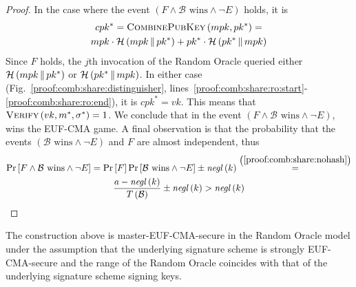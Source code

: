 \begin{proof}
      In the case where the event $\left(F \wedge \mathcal{B} \text{ wins}
      \wedge \neg E\right)$ holds, it is
      \begin{gather*}
        cpk^* = \textsc{CombinePubKey}\left(mpk, pk^*\right) = \\
        mpk \cdot \mathcal{H}\left(mpk \,\|\, pk^*\right) + pk^* \cdot
        \mathcal{H}\left(pk^* \,\|\, mpk\right)
      \end{gather*}
      Since $F$ holds, the $j$th invocation of the Random Oracle queried either
      $\mathcal{H}\left(mpk \,\|\, pk^*\right)$ or $\mathcal{H}\left(pk^*
      \,\|\, mpk\right)$. In either case
      (Fig.~\ref{proof:comb:share:distinguisher},
      lines~\ref{proof:comb:share:ro:start}-\ref{proof:comb:share:ro:end}),
      it is $cpk^* = vk$. This means that $\textsc{Verify}\left(vk, m^*,
      \sigma^*\right) = 1$. We conclude that in the event $\left(F \wedge
      \mathcal{B} \text{ wins} \wedge \neg E\right)$, \adversary{} wins the
      \textsf{EUF-CMA} game. A final observation is that the probability that
      the events $\left(\mathcal{B} \text{ wins} \wedge \neg E\right)$ and $F$
      are almost independent, thus
      \begin{gather*}
        \Pr\left[F \wedge \mathcal{B} \text{ wins} \wedge \neg E\right] =
        \Pr\left[F\right] \Pr\left[\mathcal{B} \text{ wins} \wedge \neg E\right]
        \pm \mathit{negl}\left(k\right)
        \overset{\left(\ref{proof:comb:share:nohash}\right)}{=} \\
        \frac{a - \mathit{negl}\left(k\right)}{T\left(\mathcal{B}\right)} \pm
        \mathit{negl}\left(k\right) > \mathit{negl}\left(k\right)
      \end{gather*}
    \end{proof}

    \begin{lemma}
      \label{lemma:comb:master}
      The construction above is \textsf{master-EUF-CMA}-secure in the Random
      Oracle model under the assumption that the underlying signature scheme is
      strongly \textsf{EUF-CMA}-secure and the range of the Random Oracle
      coincides with that of the underlying signature scheme signing keys.
    \end{lemma}

